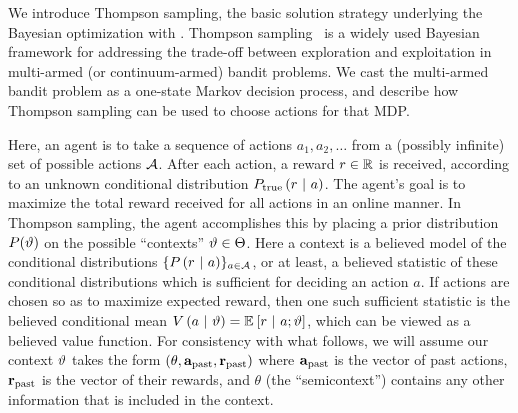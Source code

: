 We introduce Thompson sampling, the basic solution strategy
underlying the Bayesian optimization with \gpmem.
Thompson sampling~\cite{thompson1933likelihood} is a widely used Bayesian
framework for addressing the trade-off between exploration and exploitation in
multi-armed (or continuum-armed) bandit problems.  
We cast the multi-armed bandit problem as a one-state Markov
decision process, and describe how Thompson sampling can be used to choose
actions for that \ac{MDP}.

Here, an agent is to take a sequence of actions $a_1, a_2,
\ldots$ from a (possibly infinite) set of possible actions $\mathcal{A}$.  After each
action, a reward $r \in \mathbb{R}$ is received, according to an unknown conditional
distribution $P_{\textrm{true}}\left( r \ \middle\vert\  a \right)$.  The agent's goal is to maximize the
total reward received for all actions in an online manner.  In Thompson
sampling, the agent accomplishes this by placing a prior distribution
$P(\vartheta)$ on the possible ``contexts'' $\vartheta \in \Theta$.  Here a context
is a believed model of the conditional distributions $\{P\left( r \ \middle\vert\  a \right)\}_{a
\in \mathcal{A}}$, or at least, a believed statistic of these conditional
distributions which is sufficient for deciding an action $a$.  If actions are
chosen so as to maximize expected reward, then one such sufficient statistic is
the believed conditional mean $V\left( a \ \middle\vert\  \vartheta \right) = \mathbb{E}_{}\left[ r \ \middle\vert\ 
a;\vartheta \right]$, which can be viewed as a believed value function.  For
consistency with what follows, we will assume our context $\vartheta$ takes the
form $(\theta, \mathbf{a}_{\textrm{past}}, \mathbf{r}_{\textrm{past}})$ where $\mathbf{a}_{\textrm{past}}$ is the vector of past
actions, $\mathbf{r}_{\textrm{past}}$ is the vector of their rewards, and $\theta$ (the
``semicontext'') contains any other information that is included in the context.

